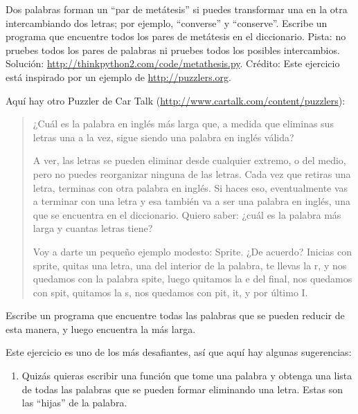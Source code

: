 \documentclass[10pt]{book}
\begin{document}
\begin{exercise}

Dos palabras forman un ``par de metátesis'' si puedes transformar una en la
otra intercambiando dos letras; por ejemplo, ``converse'' y
``conserve''.  Escribe un programa que encuentre todos los pares de metátesis
en el diccionario.  Pista: no pruebes todos los pares de palabras ni
pruebes todos los posibles intercambios.  Solución:
\url{http://thinkpython2.com/code/metathesis.py}.  Crédito: Este
ejercicio está inspirado por un ejemplo de \url{http://puzzlers.org}.

\end{exercise}


\begin{exercise}

Aquí hay otro Puzzler de Car Talk
(\url{http://www.cartalk.com/content/puzzlers}):

\begin{quote}
¿Cuál es la palabra en inglés más larga que, a medida que eliminas sus letras
una a la vez, sigue siendo una palabra en inglés válida?

A ver, las letras se pueden eliminar desde cualquier extremo, o del medio, pero
no puedes reorganizar ninguna de las letras. Cada vez que retiras una letra,
terminas con otra palabra en inglés. Si haces eso, eventualmente
vas a terminar con una letra y esa también va a ser una
palabra en inglés, una que se encuentra en el diccionario. Quiero saber:
¿cuál es la palabra más larga y cuantas letras
tiene?

Voy a darte un pequeño ejemplo modesto: Sprite. ¿De acuerdo? Inicias
con sprite, quitas una letra, una del interior de la
palabra, te llevas la r, y nos quedamos con la palabra spite, luego
quitamos la e del final, nos quedamos con spit, quitamos la s, nos
quedamos con pit, it, y por último I.
\end{quote}

Escribe un programa que encuentre todas las palabras que se pueden reducir de
esta manera, y luego encuentra la más larga.

Este ejercicio es uno de los más desafiantes, así que aquí hay
algunas sugerencias:

\begin{enumerate}

\item Quizás quieras escribir una función que tome una palabra y
  obtenga una lista de todas las palabras que se pueden formar eliminando una
  letra.  Estas son las ``hijas'' de la palabra.


\end{enumerate}
\end{exercise}
\end{document}
